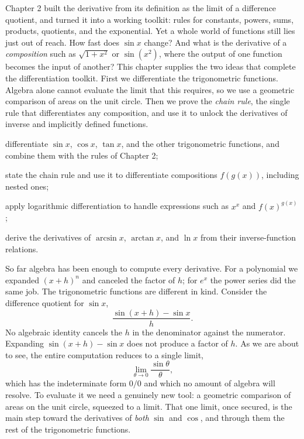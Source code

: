\documentclass[a4paper,12pt,oneside]{memoir}
\begin{document}
\begin{lead}
Chapter 2 built the derivative from its definition as the limit of a difference quotient, and turned it into a working toolkit: rules for constants, powers, sums, products, quotients, and the exponential. Yet a whole world of functions still lies just out of reach. How fast does \(\sin x\) change? And what is the derivative of a \emph{composition} such as \(\sqrt{1 + x^{2}}\) or \(\sin(x^{2})\), where the output of one function becomes the input of another? This chapter supplies the two ideas that complete the differentiation toolkit. First we differentiate the trigonometric functions. Algebra alone cannot evaluate the limit that this requires, so we use a geometric comparison of areas on the unit circle. Then we prove the \emph{chain rule}, the single rule that differentiates any composition, and use it to unlock the derivatives of inverse and implicitly defined functions.
\end{lead}
\begin{objectives}
  \item differentiate \(\sin x\), \(\cos x\), \(\tan x\), and the other trigonometric functions, and combine them with the rules of Chapter 2;
  \item state the chain rule and use it to differentiate compositions \(f(g(x))\), including nested ones;
  \item apply logarithmic differentiation to handle expressions such as \(x^{x}\) and \(f(x)^{g(x)}\);
  \item derive the derivatives of \(\arcsin x\), \(\arctan x\), and \(\ln x\) from their inverse-function relations.
\end{objectives}
So far algebra has been enough to compute every derivative. For a polynomial we expanded \((x + h)^{n}\) and canceled the factor of \(h\); for \(e^{x}\) the power series did the same job. The trigonometric functions are different in kind. Consider the difference quotient for \(\sin x\), \[ \frac{\sin(x + h) - \sin x}{h}. \] No algebraic identity cancels the \(h\) in the denominator against the numerator. Expanding \(\sin(x + h) - \sin x\) does not produce a factor of \(h\). As we are about to see, the entire computation reduces to a single limit, \[ \lim_{\theta \to 0} \frac{\sin \theta}{\theta}, \] which has the indeterminate form \(0/0\) and which no amount of algebra will resolve. To evaluate it we need a genuinely new tool: a geometric comparison of areas on the unit circle, squeezed to a limit. That one limit, once secured, is the main step toward the derivatives of \emph{both} \(\sin\) and \(\cos\), and through them the rest of the trigonometric functions.
\end{document}
